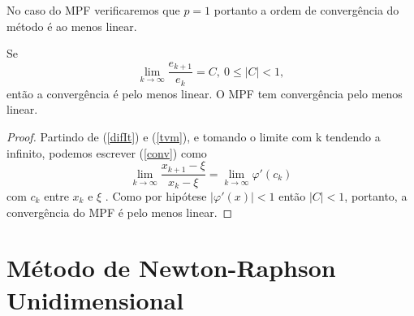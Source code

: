 No caso do MPF verificaremos que $p = 1$ portanto a ordem de convergência do método é ao menos linear.
\begin{prop}
    Se 
    \begin{equation}\label{conv}
        \lim_{k \to \infty} \frac{e_{k+1}}{e_k} = C, \ 0 \leq |C| < 1,
    \end{equation}
    então a convergência é pelo menos linear. O MPF tem convergência pelo menos linear.
\end{prop}
\begin{proof}
Partindo de (\ref{difIt}) e (\ref{tvm}), e tomando o  limite com k tendendo a infinito, podemos escrever (\ref{conv}) como
\begin{equation*} %
    \lim_{k \to \infty} \frac{x_{k+1} - \xi}{x_k - \xi} = \lim_{k \to \infty}\varphi'(c_k)
\end{equation*} %
com $c_k$ entre $x_k$ e $\xi$
. %
Como por hipótese $|\varphi'(x)| < 1$ então $|C| < 1$, portanto, a convergência do MPF é pelo menos linear.
\end{proof}
\newpage
    
\section{Método de Newton-Raphson Unidimensional}\label{sec:NR1d}

